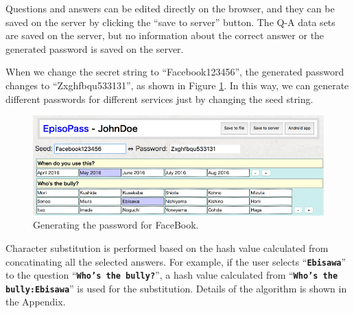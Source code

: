 \documentclass[runningheads,a4paper]{llncs}
\begin{document}
Questions and answers can be edited directly on the browser, and they can be
saved on the server by clicking the ``save to server'' button.
The Q-A data sets are saved on the server,
but no information about the correct answer or the
generated password is saved on the server.


When we change the secret string to ``\textsf{Facebook123456}'',
the generated password changes to ``\textsf{Zxghfbqu533131}'',
as shown in Figure \ref{web2}.
In this way, we can generate different passwords for
different services just by changing the seed string.

\begin{figure}[H]
\centering
\includegraphics[width=1.0\columnwidth]{figures/0e2820c279afc70520482e0fc53b6ed9}
\caption{Generating the password for FaceBook.}
\label{web2}
\end{figure}



Character substitution is performed based on the hash value
calculated from concatinating all the selected answers.
For example, if the user selects ``\textbf{\texttt{Ebisawa}}'' to the question ``\textbf{\texttt{Who's the bully?}}'',
a hash value calculated from  ``\textbf{\texttt{Who's the bully:Ebisawa}}''
is used for the substitution.
Details of the algorithm is shown in the Appendix.

\end{document}
